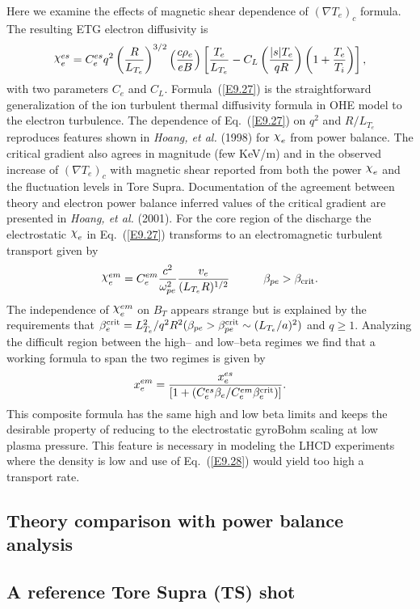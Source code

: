 \documentclass[a4paper,openany,12pt]{book}
\def\chix{\raise.5ex\hbox{$\chi$}}
\begin{document}
Here we examine the effects of magnetic shear dependence of $(\nabla T_e)_c$ formula. The resulting ETG electron diffusivity is
\begin{equation}
\chix_e^{es}=C_e^{es} q^2\left(\frac{R}{L_{T_e}}\right)^{3/2}\left(\frac{c\rho_e}{eB}\right)\left[\frac{T_e}{L_{T_e}}-C_L\left(\frac{|s|T_e}{qR}\right)\left(1+\frac{T_e}{T_i}\right)\right],\label{E9.27}
\end{equation}
with two parameters $C_e$ and $C_L$. Formula~(\ref{E9.27}) is the straightforward generalization of the ion turbulent thermal diffusivity formula in OHE model to the electron turbulence. The dependence of Eq.~(\ref{E9.27}) on $q^2$ and $R/L_{T_e}$ reproduces features shown in \emph{Hoang, et al.} (1998) for $\chix_e$ from power balance. The critical gradient also agrees in magnitude (few KeV/m) and in the observed increase of $(\nabla T_e)_c$ with magnetic shear reported from both the power $\chix_e$ and the fluctuation levels in Tore Supra. Documentation of the agreement between theory and electron power balance inferred values of the critical gradient are presented in \emph{Hoang, et al.} (2001). For the core region of the discharge the electrostatic $\chix_e$ in Eq.~(\ref{E9.27}) transforms to an electromagnetic turbulent transport given by
\begin{equation}
\chix_e^{em}=C_e^{em}\frac{c^2}{\omega_{pe}^2}\frac{v_e}{(L_{T_e}R)^{1/2}}\qquad\quad\beta_{pe}>\beta_{\rm crit}.\label{E9.28}
\end{equation}
The independence of $\chix_e^{em}$ on $B_T$ appears strange but is explained by the requirements that 
$\beta_e^{\rm crit}=L_{T_e}^2/q^2 R^2(\beta_{pe}>\beta_{pe}^{\rm crit}\sim(L_{T_e}/a)^2)$ and $q\ge 1$. Analyzing the difficult region between the high-- and low--beta regimes we find that a working formula to span the two regimes is
given by
$$x_e^{em}=\frac{x_e^{es}}{[1+(C_e^{es}\beta_e/C_e^{em}\beta_e^{\rm crit})]}.$$
This composite formula has the same high and low beta limits and keeps the desirable property of reducing to the electrostatic gyroBohm scaling at low plasma pressure. This feature is necessary in modeling the LHCD experiments where the density is low and use of Eq.~(\ref{E9.28}) would yield too high a transport rate.

\subsection{Theory comparison with power balance analysis} 
\subsection*{A reference Tore Supra (TS) shot}
\end{document}
